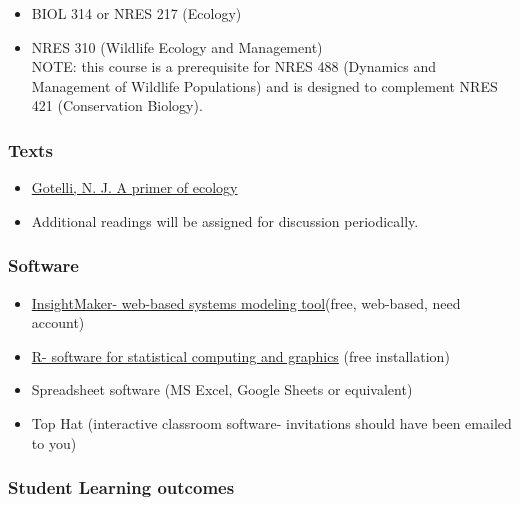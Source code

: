 \documentclass[
]{article}
\providecommand{\tightlist}{%
  \setlength{\itemsep}{0pt}\setlength{\parskip}{0pt}}
\begin{document}
\begin{itemize}
\tightlist
\item
  BIOL 314 or NRES 217 (Ecology)\\
\item
  NRES 310 (Wildlife Ecology and Management)\\
  NOTE: this course is a prerequisite for NRES 488 (Dynamics and
  Management of Wildlife Populations) and is designed to complement NRES
  421 (Conservation Biology).
\end{itemize}

\subsubsection{Texts}\label{texts}

\begin{itemize}
\tightlist
\item
  \href{https://www.amazon.com/Primer-Ecology-Fourth-Nicholas-Gotelli/dp/0878933182}{Gotelli,
  N. J. A primer of ecology}\\
\item
  Additional readings will be assigned for discussion periodically.
\end{itemize}

\subsubsection{Software}\label{software}

\begin{itemize}
\tightlist
\item
  \href{https://insightmaker.com/}{InsightMaker- web-based systems
  modeling tool}(free, web-based, need account)\\
\item
  \href{https://cran.r-project.org/}{R- software for statistical
  computing and graphics} (free installation)\\
\item
  Spreadsheet software (MS Excel, Google Sheets or equivalent)
\item
  Top Hat (interactive classroom software- invitations should have been
  emailed to you)
\end{itemize}

\subsubsection{Student Learning
outcomes}\label{student-learning-outcomes}
\end{document}
